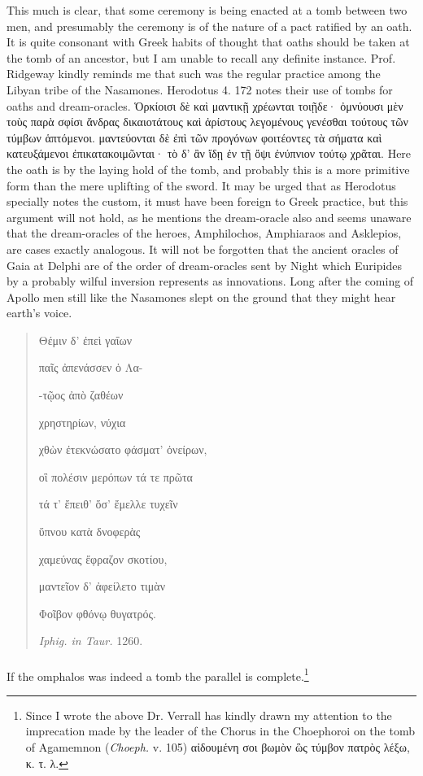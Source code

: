 \documentclass[a4paper, 11pt, oneside, polutonikogreek, english]{article}
\begin{document}
This much is clear, that some ceremony is being enacted at a tomb between two men, and presumably the ceremony is of the nature of a pact ratified by an oath. It is quite consonant with Greek habits of thought that oaths should be taken at the tomb of an ancestor, but I am unable to recall any definite instance. Prof. Ridgeway kindly reminds me that such was the regular practice among the Libyan tribe of the Nasamones. Herodotus 4. 172 notes their use of tombs for oaths and dream-oracles. Ὁρκίοισι δὲ καὶ μαντικῇ χρέωνται τοιῇδε· ὀμνύουσι μὲν τοὺς παρὰ σφίσι ἄνδρας δικαιοτάτους καὶ ἀρίστους λεγομένους γενέσθαι τούτους τῶν τύμβων ἁπτόμενοι. μαντεύονται δὲ ἐπὶ τῶν προγόνων φοιτέοντες τὰ σήματα καὶ κατευξάμενοι ἐπικατακοιμῶνται· τὸ δ' ἂν ἴδῃ ἐν τῇ ὄψι ἐνύπνιον τούτῳ χρᾶται. Here the oath is by the laying hold of the tomb, and probably this is a more primitive form than the mere uplifting of the sword. It may be urged that as Herodotus specially notes the custom, it must have been foreign to Greek practice, but this argument will not hold, as he mentions the dream-oracle also and seems unaware that the dream-oracles of the heroes, Amphilochos, Amphiaraos and Asklepios, are cases exactly analogous. It will not be forgotten that the ancient oracles of Gaia at Delphi are of the order of dream-oracles sent by Night which Euripides by a probably wilful inversion represents as innovations. Long after the coming of Apollo men still like the Nasamones slept on the ground that they might hear earth's voice.
\begin{quotation}
Θέμιν δ' ἐπεὶ γαΐων

παῖς ἀπενάσσεν ὁ Λα-

-τῷος ἀπὸ ζαθέων

χρηστηρίων, νύχια

χθὼν ἐτεκνώσατο φάσματ' ὀνείρων,

οἳ πολέσιν μερόπων τά τε πρῶτα

τά τ' ἔπειθ' ὅσ' ἔμελλε τυχεῖν

ὕπνου κατὰ δνοφερὰς

χαμεύνας ἔφραζον σκοτίου,

μαντεῖον δ' ἀφείλετο τιμὰν

Φοῖβον φθόνῳ θυγατρός.

\hspace*{20mm}\emph{Iphig. in Taur.} 1260.
\end{quotation}
\paragraph{}
If the omphalos was indeed a tomb the parallel is complete.\footnote{Since I wrote the above Dr. Verrall has kindly drawn my attention to the imprecation made by the leader of the Chorus in the Choephoroi on the tomb of Agamemnon (\emph{Choeph.} v. 105) αἰδουμένη σοι βωμὸν ὣς τύμβον πατρὸς λέξω, κ. τ. λ.}
\end{document}

